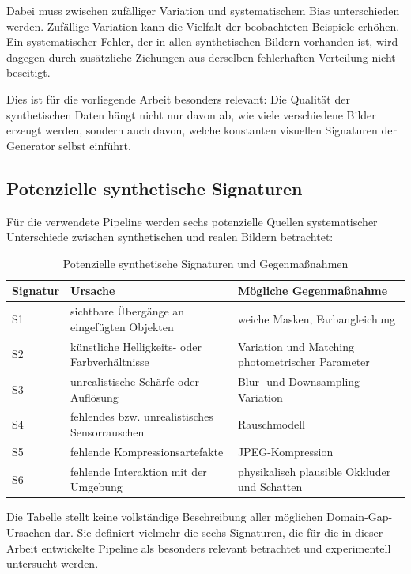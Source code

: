 Dabei muss zwischen zufälliger Variation und systematischem Bias unterschieden werden. Zufällige Variation kann die Vielfalt der beobachteten Beispiele erhöhen. Ein systematischer Fehler, der in allen synthetischen Bildern vorhanden ist, wird dagegen durch zusätzliche Ziehungen aus derselben fehlerhaften Verteilung nicht beseitigt.

Dies ist für die vorliegende Arbeit besonders relevant: Die Qualität der synthetischen Daten hängt nicht nur davon ab, wie viele verschiedene Bilder erzeugt werden, sondern auch davon, welche konstanten visuellen Signaturen der Generator selbst einführt.

\subsection{Potenzielle synthetische Signaturen}

Für die verwendete Pipeline werden sechs potenzielle Quellen systematischer Unterschiede zwischen synthetischen und realen Bildern betrachtet:

\begin{table}[htbp]
\centering
\caption{Potenzielle synthetische Signaturen und Gegenmaßnahmen}
\label{tab:synthetic-signatures}
\begin{tabular}{lll}
\hline
\textbf{Signatur} & \textbf{Ursache} & \textbf{Mögliche Gegenmaßnahme} \\
\hline
S1 & sichtbare Übergänge an eingefügten Objekten & weiche Masken, Farbangleichung \\
S2 & künstliche Helligkeits- oder Farbverhältnisse & Variation und Matching photometrischer Parameter \\
S3 & unrealistische Schärfe oder Auflösung & Blur- und Downsampling-Variation \\
S4 & fehlendes bzw. unrealistisches Sensorrauschen & Rauschmodell \\
S5 & fehlende Kompressionsartefakte & JPEG-Kompression \\
S6 & fehlende Interaktion mit der Umgebung & physikalisch plausible Okkluder und Schatten \\
\hline
\end{tabular}
\end{table}

Die Tabelle stellt keine vollständige Beschreibung aller möglichen Domain-Gap-Ursachen dar. Sie definiert vielmehr die sechs Signaturen, die für die in dieser Arbeit entwickelte Pipeline als besonders relevant betrachtet und experimentell untersucht werden.


